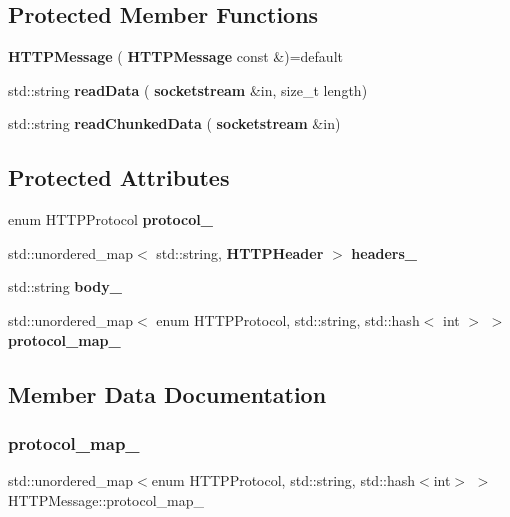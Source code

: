 \subsection*{Protected Member Functions}
\begin{DoxyCompactItemize}
\item 
\mbox{\label{classHTTPMessage_a88e7a8be4c066a7b176b1056e1c7f1c3}} 
{\bfseries H\+T\+T\+P\+Message} (\textbf{ H\+T\+T\+P\+Message} const \&)=default
\item 
\mbox{\label{classHTTPMessage_ab9893f4c8d1dcf73c501b517c72c0580}} 
std\+::string {\bfseries read\+Data} (\textbf{ socketstream} \&in, size\+\_\+t length)
\item 
\mbox{\label{classHTTPMessage_ae4f101be9ad006073841dd061cda96d5}} 
std\+::string {\bfseries read\+Chunked\+Data} (\textbf{ socketstream} \&in)
\end{DoxyCompactItemize}
\subsection*{Protected Attributes}
\begin{DoxyCompactItemize}
\item 
\mbox{\label{classHTTPMessage_a7976830c61450260e2c99f0085452ea9}} 
enum H\+T\+T\+P\+Protocol {\bfseries protocol\+\_\+}
\item 
\mbox{\label{classHTTPMessage_ab7cf254080ed6016e48ce35f0e7b4823}} 
std\+::unordered\+\_\+map$<$ std\+::string, \textbf{ H\+T\+T\+P\+Header} $>$ {\bfseries headers\+\_\+}
\item 
\mbox{\label{classHTTPMessage_a2b896c9db5817be3c6e3241098a10c90}} 
std\+::string {\bfseries body\+\_\+}
\item 
std\+::unordered\+\_\+map$<$ enum H\+T\+T\+P\+Protocol, std\+::string, std\+::hash$<$ int $>$ $>$ {\bfseries protocol\+\_\+map\+\_\+}
\end{DoxyCompactItemize}


\subsection{Member Data Documentation}
\mbox{\label{classHTTPMessage_aedb87040c568ae7cd3dcc106af8dc7f9}} 
\subsubsection{protocol\+\_\+map\+\_\+}
{\footnotesize\ttfamily std\+::unordered\+\_\+map$<$enum H\+T\+T\+P\+Protocol, std\+::string, std\+::hash$<$int$>$ $>$ H\+T\+T\+P\+Message\+::protocol\+\_\+map\+\_\+\hspace{0.3cm}{\ttfamily [protected]}}

